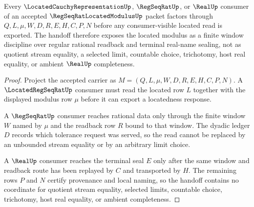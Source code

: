 \begin{theorem}
\label{thm:regseqrat-located-modulus-window-stability}
Every $\LocatedCauchyRepresentationUp$, $\RegSeqRatUp$, or $\RealUp$ consumer of an accepted $\RegSeqRatLocatedModulusUp$ packet factors through $Q,L,\mu,W,D,R,E,H,C,P,N$ before any consumer-visible located read is exported. The handoff therefore exposes the located modulus as a finite window discipline over regular rational readback and terminal real-name sealing, not as quotient stream equality, a selected limit, countable choice, trichotomy, host real equality, or ambient $\RealUp$ completeness.
\end{theorem}
\begin{proof}
Project the accepted carrier as $M=(Q,L,\mu,W,D,R,E,H,C,P,N)$. A $\LocatedRegSeqRatUp$ consumer must read the located row $L$ together with the displayed modulus row $\mu$ before it can export a locatedness response.

A $\RegSeqRatUp$ consumer reaches rational data only through the finite window $W$ named by $\mu$ and the readback row $R$ bound to that window. The dyadic ledger $D$ records which tolerance request was served, so the read cannot be replaced by an unbounded stream equality or by an arbitrary limit choice.

A $\RealUp$ consumer reaches the terminal seal $E$ only after the same window and readback route has been replayed by $C$ and transported by $H$. The remaining rows $P$ and $N$ certify provenance and local naming, so the handoff contains no coordinate for quotient stream equality, selected limits, countable choice, trichotomy, host real equality, or ambient completeness.
\end{proof}

